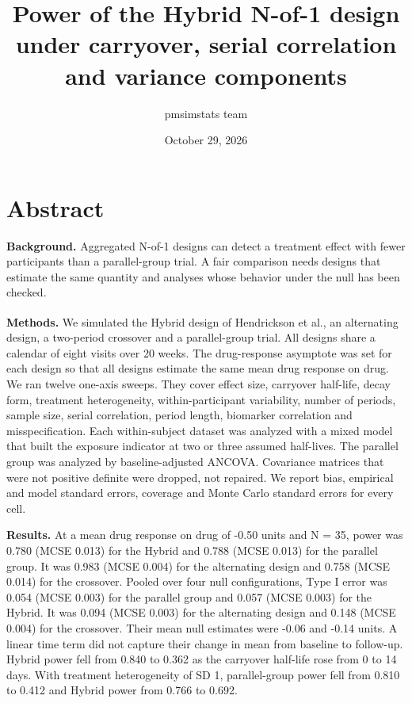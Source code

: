 \documentclass[
  11pt,
]{article}
\title{Power of the Hybrid N-of-1 design under carryover, serial correlation and variance components}
\author{pmsimstats team}
\date{October 29, 2026}
\begin{document}
\maketitle

{
\setcounter{tocdepth}{2}
\tableofcontents
}
\section{Abstract}\label{abstract}

\textbf{Background.} Aggregated N-of-1 designs can detect a treatment effect with fewer participants than a parallel-group trial. A fair comparison needs designs that estimate the same quantity and analyses whose behavior under the null has been checked.

\textbf{Methods.} We simulated the Hybrid design of Hendrickson et al.\textsuperscript{}, an alternating design, a two-period crossover and a parallel-group trial. All designs share a calendar of eight visits over 20 weeks. The drug-response asymptote was set for each design so that all designs estimate the same mean drug response on drug. We ran twelve one-axis sweeps. They cover effect size, carryover half-life, decay form, treatment heterogeneity, within-participant variability, number of periods, sample size, serial correlation, period length, biomarker correlation and misspecification. Each within-subject dataset was analyzed with a mixed model that built the exposure indicator at two or three assumed half-lives. The parallel group was analyzed by baseline-adjusted ANCOVA. Covariance matrices that were not positive definite were dropped, not repaired. We report bias, empirical and model standard errors, coverage and Monte Carlo standard errors for every cell.

\textbf{Results.} At a mean drug response on drug of -0.50 units and N = 35, power was 0.780 (MCSE 0.013) for the Hybrid and 0.788 (MCSE 0.013) for the parallel group. It was 0.983 (MCSE 0.004) for the alternating design and 0.758 (MCSE 0.014) for the crossover. Pooled over four null configurations, Type I error was 0.054 (MCSE 0.003) for the parallel group and 0.057 (MCSE 0.003) for the Hybrid. It was 0.094 (MCSE 0.003) for the alternating design and 0.148 (MCSE 0.004) for the crossover. Their mean null estimates were -0.06 and -0.14 units. A linear time term did not capture their change in mean from baseline to follow-up. Hybrid power fell from 0.840 to 0.362 as the carryover half-life rose from 0 to 14 days. With treatment heterogeneity of SD 1, parallel-group power fell from 0.810 to 0.412 and Hybrid power from 0.766 to 0.692.
\end{document}
